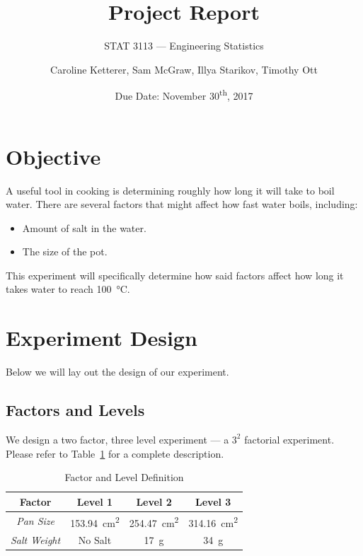 \documentclass[12pt,titlepage=false]{scrartcl}
\title{Project Report}
\subtitle{STAT 3113 --- Engineering Statistics}
\date{Due Date: November 30\textsuperscript{th}, 2017}
\author{Caroline Ketterer, Sam McGraw, Illya Starikov, Timothy Ott}
\begin{document}
\maketitle
\tableofcontents

\section{Objective}
A useful tool in cooking is determining roughly how long it will take to boil water. There are several factors that might affect how fast water boils, including:

\begin{itemize}
    \item Amount of salt in the water.
    \item The size of the pot.
\end{itemize}

This experiment will specifically determine how said factors affect how long it takes water to reach \SI{100}{\degreeCelsius}.

\section{Experiment Design}
\label{sec:experiment_design}
Below we will lay out the design of our experiment.

\subsection{Factors and Levels}
\label{sub:factors_and_levels}
We design a two factor, three level experiment --- a $3^2$ factorial experiment. Please refer to Table~\ref{tab:factors_levels} for a complete description.

\begin{table}[H]
    \centering
    \caption{Factor and Level Definition}
    \label{tab:factors_levels}
    \begin{tabular}{cccc}
        \toprule
        \textbf{Factor} & \textbf{Level 1} & \textbf{Level 2} & \textbf{Level 3} \\\hline
        \textit{Pan Size} & \SI{153.94}{\centi\meter\squared} & \SI{254.47}{\centi\meter\squared} & \SI{314.16}{\centi\meter\squared} \\
        \textit{Salt Weight} & No Salt & \SI{17}{\gram} & \SI{34}{\gram} \\
        \bottomrule
    \end{tabular}
\end{table}
\end{document}

